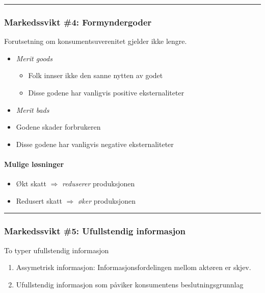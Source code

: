 \documentclass[
  letterpaper,
  DIV=11,
  numbers=noendperiod]{scrartcl}
\let\oldparagraph\paragraph
\renewcommand{\paragraph}[1]{\oldparagraph{#1}\mbox{}}
\providecommand{\tightlist}{%
  \setlength{\itemsep}{0pt}\setlength{\parskip}{0pt}}\usepackage{longtable,booktabs,array}
\begin{document}
\begin{center}\rule{0.5\linewidth}{0.5pt}\end{center}

\subsubsection{Markedssvikt \#4:
Formyndergoder}\label{markedssvikt-4-formyndergoder}

Forutsetning om konsumentsuverenitet gjelder ikke lengre.

\begin{itemize}
\tightlist
\item
  \emph{Merit goods}

  \begin{itemize}
  \tightlist
  \item
    Folk innser ikke den sanne nytten av godet
  \item
    Disse godene har vanligvis positive eksternaliteter
  \end{itemize}
\item
  \emph{Merit bads}
\item
  Godene skader forbrukeren
\item
  Disse godene har vanligvis negative eksternaliteter
\end{itemize}

\paragraph{Mulige løsninger}\label{mulige-luxf8sninger-3}

\begin{itemize}
\tightlist
\item
  Økt skatt \(\Rightarrow\) \emph{reduserer} produksjonen
\item
  Redusert skatt \(\Rightarrow\) \emph{øker} produksjonen
\end{itemize}

\begin{center}\rule{0.5\linewidth}{0.5pt}\end{center}

\subsubsection{Markedssvikt \#5: Ufullstendig
informasjon}\label{markedssvikt-5-ufullstendig-informasjon}

To typer ufullstendig informasjon

\begin{enumerate}
\def\labelenumi{\arabic{enumi}.}
\item
  Assymetrisk informasjon: Informasjonsfordelingen mellom aktøren er
  skjev.
\item
  Ufullstendig informasjon som påviker konsumentens beslutningsgrunnlag
\end{enumerate}
\end{document}
